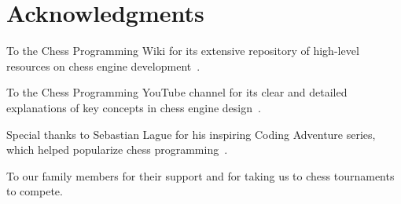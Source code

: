 
\chapter*{Acknowledgments}

\noindent To the Chess Programming Wiki for its extensive repository of high-level resources on chess engine development~\cite{ChessProgrammingWiki}.

\vspace{1em}

\noindent To the Chess Programming YouTube channel for its clear and detailed explanations of key concepts in chess engine design~\cite{ChessProgrammingYT}.

\vspace{1em}

\noindent Special thanks to Sebastian Lague for his inspiring Coding Adventure series, which helped popularize chess programming~\cite{SebastianLagueYT}.

\vspace{1em}

\noindent To our family members for their support and for taking us to chess tournaments to compete.
